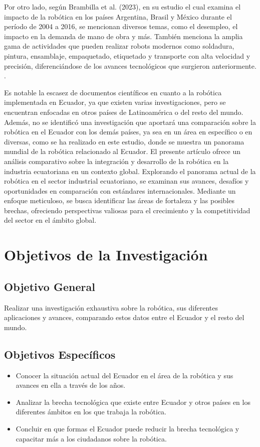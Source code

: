\documentclass[conference]{IEEEtran}
\begin{document}
Por otro lado, según Brambilla et al. (2023), en su estudio el cual examina el impacto de la robótica en los países Argentina, Brasil y México durante el período de 2004 a 2016, se mencionan diversos temas, como el desempleo, el impacto en la demanda de mano de obra y más. También menciona la amplia gama de actividades que pueden realizar robots modernos como soldadura, pintura, ensamblaje, empaquetado, etiquetado y transporte con alta velocidad y precisión, diferenciándose de los avances tecnológicos que surgieron anteriormente. \cite{Brambilla2023} .

Es notable la escasez de documentos científicos en cuanto a la robótica implementada en Ecuador, ya que existen varias investigaciones, pero se encuentran enfocadas en otros países de Latinoamérica o del resto del mundo. Además, no se identificó una investigación que aportará una comparación sobre la robótica en el Ecuador con los demás países, ya sea en un área en específico o en diversas, como se ha realizado en este estudio, donde se muestra un panorama mundial de la robótica relacionado al Ecuador. El presente artículo ofrece un análisis comparativo sobre la integración y desarrollo de la robótica en la industria ecuatoriana en un contexto global. Explorando el panorama actual de la robótica en el sector industrial ecuatoriano, se examinan sus avances, desafíos y oportunidades en comparación con estándares internacionales. Mediante un enfoque meticuloso, se busca identificar las áreas de fortaleza y las posibles brechas, ofreciendo perspectivas valiosas para el crecimiento y la competitividad del sector en el ámbito global.



\section{Objetivos de la Investigación}

\subsection{Objetivo General}

Realizar una investigación exhaustiva sobre la robótica, sus diferentes aplicaciones y avances, comparando estos datos entre el Ecuador y el resto del mundo.

\subsection{Objetivos Específicos}
\begin{itemize}
\item Conocer la situación actual del Ecuador en el área de la robótica y sus avances en ella a través de los años.
\item Analizar la brecha tecnológica que existe entre Ecuador y otros países en los diferentes ámbitos en los que trabaja la robótica.
\item Concluir en que formas el Ecuador puede reducir la brecha tecnológica y capacitar más a los ciudadanos sobre la robótica.

\end{itemize}
\end{document}
